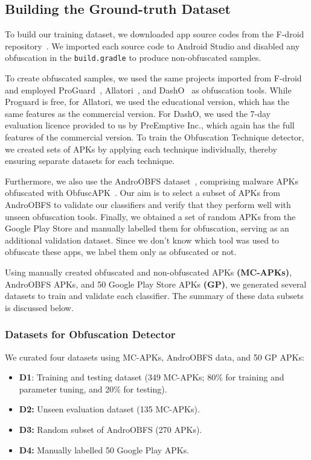 \subsection{Building the Ground-truth Dataset}
\label{sec:building_dataset}

To build our training dataset, we downloaded app source codes from the F-droid repository~\cite{fdroid}. We imported each source code to Android Studio and disabled any obfuscation in the \texttt{build.gradle} to produce non-obfuscated samples. 


To create obfuscated samples, we used the same projects imported from F-droid and employed ProGuard~\cite{proguard}, Allatori~\cite{allatori}, and DashO~\cite{dasho} as obfuscation tools. While Proguard is free, for Allatori, we used the educational version, which has the same features as the commercial version. For DashO, we used the 7-day evaluation licence provided to us by PreEmptive Inc., which again has the full features of the commercial version. To train the Obfuscation Technique detector, we created sets of APKs by applying each technique individually, thereby ensuring separate datasets for each technique.

Furthermore, we also use the AndroOBFS dataset~\cite{androobfs}, comprising malware APKs obfuscated with ObfuscAPK~\cite{obfuscapk}. Our aim is to select a subset of APKs from AndroOBFS to validate our classifiers and verify that they perform well with unseen obfuscation tools. Finally, we obtained a set of random APKs from the Google Play Store and manually labelled them for obfuscation, serving as an additional validation dataset. Since we don't know which tool was used to obfuscate these apps, we label them only as obfuscated or not.


Using manually created obfuscated and non-obfuscated APKs \textbf{(MC-APKs)}, AndroOBFS APKs, and 50 Google Play Store APKs \textbf{(GP)}, we generated several datasets to train and validate each classifier. The summary of these data subsets is discussed below.

\subsubsection{Datasets for Obfuscation Detector}

We curated four datasets using MC-APKs, AndroOBFS data, and 50 GP APKs:
\begin{itemize}
    \item {\bf D1}: Training and testing dataset (349 MC-APKs; 80\% for training and parameter tuning, and 20\% for testing). 
    \item {\bf D2:} Unseen evaluation dataset (135 MC-APKs).
    \item {\bf D3:} Random subset of AndroOBFS (270 APKs).
    \item {\bf D4:} Manually labelled 50 Google Play APKs.
\end{itemize}

